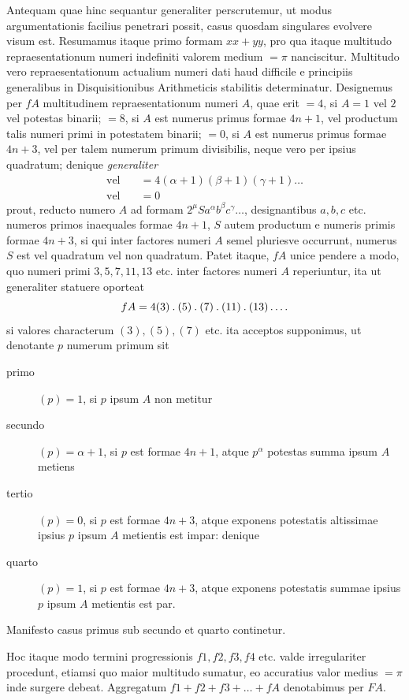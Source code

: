 Antequam quae hinc sequantur generaliter perscrutemur, ut modus argumentationis facilius penetrari possit, casus quosdam singulares evolvere visum est. Resumamus itaque primo formam $xx+yy$, pro qua itaque multitudo repraesentationum numeri indefiniti valorem medium $=\pi$ nanciscitur. Multitudo vero repraesentationum actualium numeri dati haud difficile e principiis generalibus in Disquisitionibus Arithmeticis stabilitis determinatur. Designemus per $fA$ multitudinem repraesentationum numeri $A$, quae erit $=4$, si $A=1$ vel $2$ vel potestas binarii; $=8$, si $A$ est numerus primus formae $4n+1$, vel productum
%
talis numeri primi in potestatem binarii; $=0$, si $A$ est numerus primus formae $4n+3$, vel per talem numerum primum divisibilis, neque vero per ipsius quadratum; denique \emph{generaliter}
\[
\begin{aligned}
\text{vel}\quad&=4(\alpha+1)(\beta+1)(\gamma+1)\ldots\\
\text{vel}\quad&=0
\end{aligned}
\]
prout, reducto numero $A$ ad formam $2^\mu Sa^\alpha b^\beta c^\gamma\ldots$, designantibus $a,b,c$ etc. numeros primos inaequales formae $4n+1$, $S$ autem productum e numeris primis formae $4n+3$, si qui inter factores numeri $A$ semel pluriesve occurrunt, numerus $S$ est vel quadratum vel non quadratum. Patet itaque, $fA$ unice pendere a modo, quo numeri primi $3,5,7,11,13$ etc. inter factores numeri $A$ reperiuntur, ita ut generaliter statuere oporteat
\[
fA=4(3)\mathbin{.}(5)\mathbin{.}(7)\mathbin{.}(11)\mathbin{.}(13)\mathinner{.\,.\,.\,.}
\]
si valores characterum $(3),(5),(7)$ etc. ita acceptos supponimus, ut denotante $p$ numerum primum sit

\begin{description}
\item[primo] $(p)=1$, si $p$ ipsum $A$ non metitur
\item[secundo] $(p)=\alpha+1$, si $p$ est formae $4n+1$, atque $p^\alpha$ potestas summa ipsum $A$ metiens
\item[tertio] $(p)=0$, si $p$ est formae $4n+3$, atque exponens potestatis altissimae ipsius $p$ ipsum $A$ metientis est impar: denique
\item[quarto] $(p)=1$, si $p$ est formae $4n+3$, atque exponens potestatis summae ipsius $p$ ipsum $A$ metientis est par.
\end{description}
Manifesto casus primus sub secundo et quarto continetur.

Hoc itaque modo termini progressionis $f1,f2,f3,f4$ etc. valde irregulariter procedunt, etiamsi quo maior multitudo sumatur, eo accuratius valor medius $=\pi$ inde surgere debeat. Aggregatum $f1+f2+f3+\ldots+fA$ denotabimus per $FA$.

